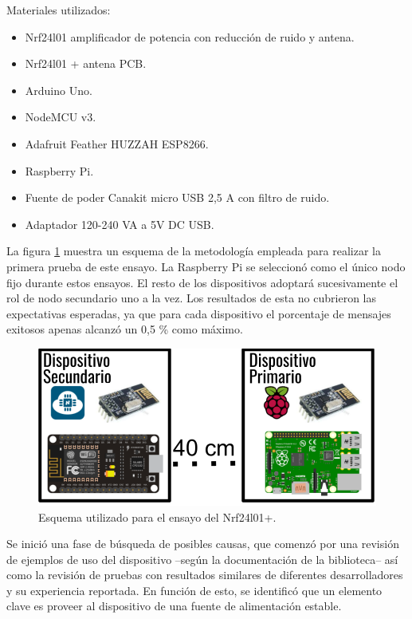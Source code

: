 Materiales utilizados:
\begin{itemize}
\item  Nrf24l01 amplificador de potencia con reducción de ruido y antena.
\item  Nrf24l01 + antena PCB.
\item  Arduino Uno.   
\item  NodeMCU v3.
\item  Adafruit Feather HUZZAH ESP8266.
\item  Raspberry Pi.
\item  Fuente de poder Canakit micro USB 2,5 A con filtro de ruido.
\item Adaptador 120-240 VA a 5V DC USB.
\end{itemize}

La figura \ref{fig:figura_a} muestra un esquema de la metodología empleada para realizar la primera prueba de este ensayo. La Raspberry Pi se seleccionó como el único nodo fijo durante estos ensayos. El resto de los dispositivos adoptará sucesivamente el rol de nodo secundario uno a la vez. Los resultados de esta no cubrieron las expectativas esperadas, ya que para cada dispositivo el porcentaje de mensajes exitosos apenas alcanzó un 0,5 \% como máximo.

\vspace{5mm} %

\begin{figure}[ht]
	\centering
	\includegraphics[scale=.45]{./Figures/Capitulo4/Figura_A.png}
	\caption{Esquema utilizado para el ensayo del Nrf24l01+.}
	\label{fig:figura_a}
\end{figure}


Se inició una fase de búsqueda de posibles causas, que comenzó por una revisión de ejemplos de uso del dispositivo --según la documentación de la biblioteca-- así como la revisión de pruebas con resultados similares de diferentes desarrolladores y su experiencia reportada. En función de esto, se identificó que un elemento clave es proveer al dispositivo de una fuente de alimentación estable.

